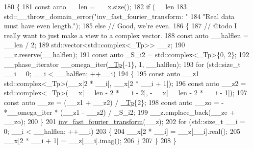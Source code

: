 \begin{DoxyCode}
180     \{
181       \textcolor{keyword}{const} \textcolor{keyword}{auto} \_\_len = \_\_x.size();
182       \textcolor{keywordflow}{if} (\_\_len %
183         std::\_\_throw\_domain\_error(\textcolor{stringliteral}{"inv\_fast\_fourier\_transform: "}
184                                   \textcolor{stringliteral}{"Real data must have even length."});
185       \textcolor{keywordflow}{else} \textcolor{comment}{// Good, we're even.}
186         \{
187           \textcolor{comment}{// @todo I really want to just make a view to a complex vector.}
188           \textcolor{keyword}{const} \textcolor{keyword}{auto} \_\_halflen = \_\_len / 2;
189           std::vector<std::complex<\_Tp>> \_\_z;
190           \_\_z.reserve(\_\_halflen);
191           \textcolor{keyword}{const} \textcolor{keyword}{auto} \_S\_i2 = std::complex<\_Tp>\{0, 2\};
192           \_\_phase\_iterator \_\_omega\_iter(\hyperlink{namespace____gnu__cxx_a3b19a9c800ca194374ef9172290f7d79}{\_Tp}\{-1\}, 1, \_\_halflen);
193           \textcolor{keywordflow}{for} (std::size\_t \_\_i = 0; \_\_i < \_\_halflen; ++\_\_i)
194             \{
195               \textcolor{keyword}{const} \textcolor{keyword}{auto} \_\_z1 = std::complex<\_Tp>(\_\_x[2 * \_\_i], \_\_x[2 * \_\_i + 1]);
196               \textcolor{keyword}{const} \textcolor{keyword}{auto} \_\_z2 = std::complex<\_Tp>(\_\_x[\_\_len - 2 * \_\_i - 2], -\_\_x[\_\_len - 2 * \_\_i - 1]);
197               \textcolor{keyword}{const} \textcolor{keyword}{auto} \_\_ze = (\_\_z1 + \_\_z2) / \hyperlink{namespace____gnu__cxx_a3b19a9c800ca194374ef9172290f7d79}{\_Tp}\{2\};
198               \textcolor{keyword}{const} \textcolor{keyword}{auto} \_\_zo = -*\_\_omega\_iter * (\_\_z1 - \_\_z2) / \_S\_i2;
199               \_\_z.emplace\_back(\_\_ze + \_\_zo);
200             \}
201           \hyperlink{namespace____gnu__cxx_a96b56c927599a614656027d3ab4b82ac}{inv\_fast\_fourier\_transform}(\_\_z);
202           \textcolor{keywordflow}{for} (std::size\_t \_\_i = 0; \_\_i < \_\_halflen; ++\_\_i)
203             \{
204               \_\_x[2 * \_\_i] = \_\_z[\_\_i].real();
205               \_\_x[2 * \_\_i + 1] = \_\_z[\_\_i].imag();
206             \}
207         \}
208     \}
\end{DoxyCode}
\mbox{\label{namespace____gnu__cxx_a98a4b1edde28198a694042bea78da893}} 
